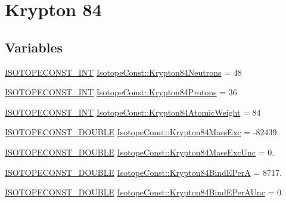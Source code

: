 \hypertarget{group___isotope_const-_krypton-_kr84}{}\section{Krypton 84}
\label{group___isotope_const-_krypton-_kr84}
\subsection*{Variables}
\begin{DoxyCompactItemize}
\item 
\mbox{\hyperlink{group___isotope_const-_macros_ga5f18360b3e99483a35c32d789e62621c}{I\+S\+O\+T\+O\+P\+E\+C\+O\+N\+S\+T\+\_\+\+I\+NT}} \mbox{\hyperlink{group___isotope_const-_krypton-_kr84_ga9500b49cdac918d3d5ecd9a29003fe9f}{Isotope\+Const\+::\+Krypton84\+Neutrons}} = 48
\item 
\mbox{\hyperlink{group___isotope_const-_macros_ga5f18360b3e99483a35c32d789e62621c}{I\+S\+O\+T\+O\+P\+E\+C\+O\+N\+S\+T\+\_\+\+I\+NT}} \mbox{\hyperlink{group___isotope_const-_krypton-_kr84_ga4f7f0e2c71c660687fe58b100023cfb8}{Isotope\+Const\+::\+Krypton84\+Protons}} = 36
\item 
\mbox{\hyperlink{group___isotope_const-_macros_ga5f18360b3e99483a35c32d789e62621c}{I\+S\+O\+T\+O\+P\+E\+C\+O\+N\+S\+T\+\_\+\+I\+NT}} \mbox{\hyperlink{group___isotope_const-_krypton-_kr84_ga2384dc9739a8cb9fe9f020bed2218dc6}{Isotope\+Const\+::\+Krypton84\+Atomic\+Weight}} = 84
\item 
\mbox{\hyperlink{group___isotope_const-_macros_ga8f45a7272ce02c0b4c65c44636ed719a}{I\+S\+O\+T\+O\+P\+E\+C\+O\+N\+S\+T\+\_\+\+D\+O\+U\+B\+LE}} \mbox{\hyperlink{group___isotope_const-_krypton-_kr84_gabb9c47b52c48cd760a8d74eb82249940}{Isotope\+Const\+::\+Krypton84\+Mass\+Exc}} = -\/82439.
\item 
\mbox{\hyperlink{group___isotope_const-_macros_ga8f45a7272ce02c0b4c65c44636ed719a}{I\+S\+O\+T\+O\+P\+E\+C\+O\+N\+S\+T\+\_\+\+D\+O\+U\+B\+LE}} \mbox{\hyperlink{group___isotope_const-_krypton-_kr84_ga57761cd78b43b2e69c8419a0bc0e0667}{Isotope\+Const\+::\+Krypton84\+Mass\+Exc\+Unc}} = 0.
\item 
\mbox{\hyperlink{group___isotope_const-_macros_ga8f45a7272ce02c0b4c65c44636ed719a}{I\+S\+O\+T\+O\+P\+E\+C\+O\+N\+S\+T\+\_\+\+D\+O\+U\+B\+LE}} \mbox{\hyperlink{group___isotope_const-_krypton-_kr84_ga32972f8c5454728879542d18b1621787}{Isotope\+Const\+::\+Krypton84\+Bind\+E\+PerA}} = 8717.
\item 
\mbox{\hyperlink{group___isotope_const-_macros_ga8f45a7272ce02c0b4c65c44636ed719a}{I\+S\+O\+T\+O\+P\+E\+C\+O\+N\+S\+T\+\_\+\+D\+O\+U\+B\+LE}} \mbox{\hyperlink{group___isotope_const-_krypton-_kr84_ga99dee1b31dba8cb4bf0341312f020cd8}{Isotope\+Const\+::\+Krypton84\+Bind\+E\+Per\+A\+Unc}} = 0

\end{DoxyCompactItemize}
